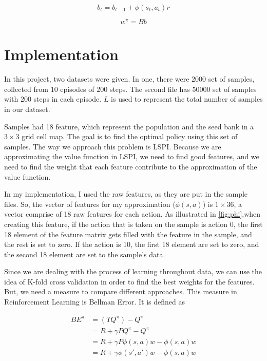 \documentclass{article}
\theoremstyle{remark}
\begin{document}
\[ b_t = b_{t-1} + \phi(s_t, a_t)r
\]

\[ w^\pi = Bb
\]

\section{Implementation}
In this project, two datasets were given. In one, there were 2000 set of samples, collected from 10 episodes of 200 steps. The second file has 50000 set of samples with 200 steps in each episode. $L$ is used to represent the total number of samples in our dataset.

Samples had 18 feature, which represent the population and the seed bank in a $3 \times 3$ grid cell map. The goal is to find the optimal policy using this set of samples. The way we approach this problem is LSPI. Because we are approximating the value function in LSPI, we need to find good features, and we need to find the weight that each feature contribute to the approximation of the value function.

In my implementation, I used the raw features, as they are put in the sample files. So, the vector of features for my approximation ($\phi(s,a)$) is $1 \times 36$, a vector comprise of 18 raw features for each action. As illustrated in \ref{fig:phi},when creating this feature, if the action that is taken on the sample is action 0, the first 18 element of the feature matrix gets filled with the feature in the sample, and the rest is set to zero. If the action is 10, the first 18 element are set to zero, and the second 18 element are set to the sample's data.

Since we are dealing with the process of learning throughout data, we can use the idea of K-fold cross validation in order to find the best weights for the features. But, we need a measure to compare different approaches. This measure in Reinforcement Learning is Bellman Error. It is defined as

\[
\begin{split}
 BE^\pi & =(TQ^\pi) - Q^\pi \\
 & = R + \gamma P Q^\pi - Q^\pi \\
 & = R + \gamma P \phi(s,a) w - \phi(s,a) w \\
 & = R + \gamma \phi(s',a') w - \phi(s,a) w 
\end{split}
\]
\end{document}
